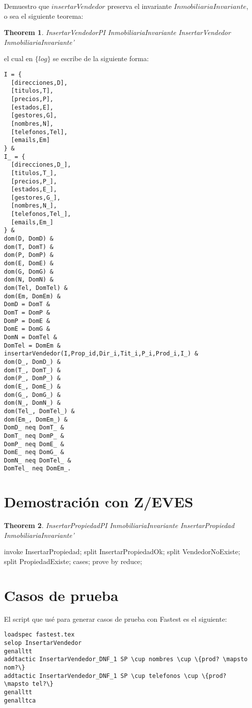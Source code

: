 \documentclass[12pt]{article}
\newtheorem{theorem}{Theorem}
\newcommand{\setlog}{$\{log\}$\xspace}
\begin{document}
Demuestro que $insertarVendedor$ preserva el invariante $InmobiliariaInvariante$, o sea el siguiente teorema:
\begin{theorem}{InsertarVendedorPI}
InmobiliariaInvariante \land InsertarVendedor \implies InmobiliariaInvariante'
\end{theorem}
el cual en \setlog se escribe de la siguiente forma:
\begin{verbatim}
I = {
  [direcciones,D],
  [titulos,T],
  [precios,P],
  [estados,E],
  [gestores,G],
  [nombres,N],
  [telefonos,Tel],
  [emails,Em]
} &
I_ = {
  [direcciones,D_],
  [titulos,T_],
  [precios,P_],
  [estados,E_],
  [gestores,G_],
  [nombres,N_],
  [telefonos,Tel_],
  [emails,Em_]
} &
dom(D, DomD) &  
dom(T, DomT) &  
dom(P, DomP) &  
dom(E, DomE) &  
dom(G, DomG) &  
dom(N, DomN) &  
dom(Tel, DomTel) &  
dom(Em, DomEm) &
DomD = DomT &
DomT = DomP &
DomP = DomE &
DomE = DomG &
DomN = DomTel &
DomTel = DomEm &
insertarVendedor(I,Prop_id,Dir_i,Tit_i,P_i,Prod_i,I_) &
dom(D_, DomD_) &  
dom(T_, DomT_) &  
dom(P_, DomP_) &  
dom(E_, DomE_) &  
dom(G_, DomG_) &  
dom(N_, DomN_) &  
dom(Tel_, DomTel_) &  
dom(Em_, DomEm_) &
DomD_ neq DomT_ &
DomT_ neq DomP_ &
DomP_ neq DomE_ &
DomE_ neq DomG_ &
DomN_ neq DomTel_ &
DomTel_ neq DomEm_.
\end{verbatim}


\section{Demostración con Z/EVES}

\begin{theorem}{InsertarPropiedadPI}
InmobiliariaInvariante \land InsertarPropiedad \implies InmobiliariaInvariante'
\end{theorem}

\begin{zproof}[InsertarPropiedadPI]
invoke InsertarPropiedad;
split InsertarPropiedadOk;
split VendedorNoExiste;
split PropiedadExiste;
cases;
prove by reduce;
\end{zproof}

\pagebreak

\section{Casos de prueba}

El script que usé para generar casos de prueba con Fastest es el siguiente:

\begin{verbatim}
loadspec fastest.tex
selop InsertarVendedor
genalltt
addtactic InsertarVendedor_DNF_1 SP \cup nombres \cup \{prod? \mapsto nom?\}
addtactic InsertarVendedor_DNF_1 SP \cup telefonos \cup \{prod? \mapsto tel?\}
genalltt
genalltca
\end{verbatim}
\end{document}
